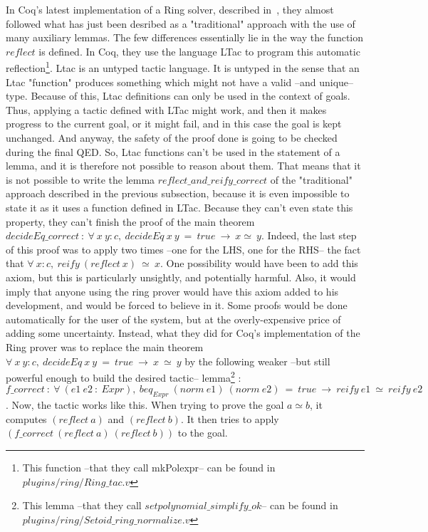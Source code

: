 In Coq's latest implementation of a Ring solver, described in~\cite{Coq2005}, they almost followed what has just been desribed as a "traditional" approach with the use of many auxiliary lemmas. The few differences essentially lie in the way the function $reflect$ is defined. In Coq, they use the language LTac to program this automatic reflection\footnote{This function --that they call mkPolexpr-- can be found in $plugins/ring/Ring\_tac.v$}. Ltac is an untyped tactic language. It is untyped in the sense that an Ltac "function" produces something which might not have a valid  --and unique-- type. Because of this, Ltac definitions can only be used in the context of goals. Thus, applying a tactic defined with LTac might work, and then it makes progress to the current goal, or it might fail, and in this case the goal is kept unchanged. And anyway, the safety of the proof done is going to be checked during the final QED. So, Ltac functions can't be used in the statement of a lemma, and it is therefore not possible to reason about them. That means that it is not possible to write the lemma $reflect\_and\_reify\_correct$ of the "traditional" approach described in the previous subsection, because it is even impossible to state it as it uses a function defined in LTac. Because they can't even state this property, they can't finish the proof of the main theorem $decideEq\_correct\ :\ \forall\  x\ y:c,\ decideEq\ x\ y\ =\ true\ \rightarrow\ x \simeq\ y$. Indeed, the last step of this proof was to apply two times --one for the LHS, one for the RHS-- the fact that $\forall\ x:c,\ reify\ (reflect\ x)\ \simeq\ x$. One possibility would have been to add this axiom, but this is particularly unsightly, and potentially harmful. Also, it would imply that anyone using the ring prover would have this axiom added to his development, and would be forced to believe in it. Some proofs would be done automatically for the user of the system, but at the overly-expensive price of adding some uncertainty.
Instead, what they did for Coq's implementation of the Ring prover was to replace the main theorem $\forall\  x\ y:c,\ decideEq\ x\ y\ =\ true\ \rightarrow\ x\ \simeq\ y$ by the following weaker --but still powerful enough to build the desired tactic-- lemma\footnote{This lemma --that they call $setpolynomial\_simplify\_ok$-- can be found in $plugins/ring/Setoid\_ring\_normalize.v$}  : $f\_correct\ :\ \forall\ (e1\ e2\ :\ Expr),\ beq_{Expr}\ (norm\ e1)\ (norm\ e2)\ =\ true\ \rightarrow\ reify\ e1\ \simeq\ reify\ e2$.
Now, the tactic works like this. When trying to prove the goal $a \simeq b$, it computes $(reflect\ a)$ and $(reflect\ b)$. It then tries to apply $(f\_correct\ (reflect\ a)\ (reflect\ b))$ to the goal. 

